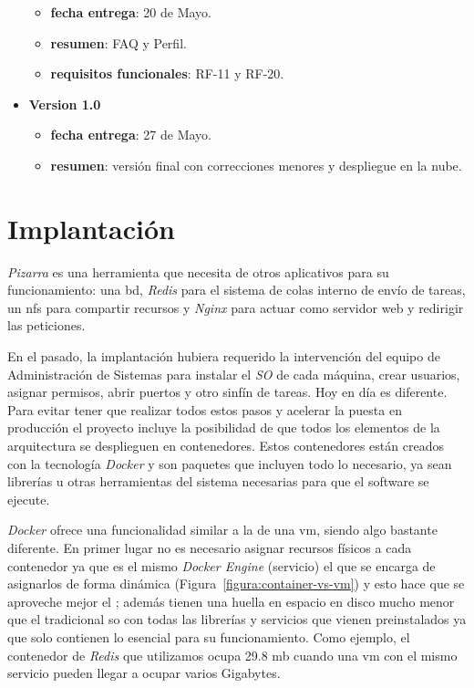 \documentclass[11pt,spanish,listoffigures,listoftables]{tfgetsinf}
\begin{document}
\begin{itemize}
\begin{itemize}
	\item \textbf{fecha entrega}: 20 de Mayo.
	\item \textbf{resumen}: FAQ y Perfil. 
	\item \textbf{requisitos funcionales}: RF-11 y RF-20.
\end{itemize}
	\item \textbf{Version 1.0}
\begin{itemize}
	\item \textbf{fecha entrega}: 27 de Mayo.
	\item \textbf{resumen}: versión final con correcciones menores y despliegue en la nube.
\end{itemize}	
\end{itemize}

\chapter{Implantación}

\textit{Pizarra} es una herramienta que necesita de otros aplicativos para su funcionamiento: una \acrfull{bd}, \textit{Redis} para el sistema de \gls{cola}s interno de envío de \gls{tarea}s, un \acrshort{nfs} para compartir recursos y \textit{Nginx} para actuar como servidor web y redirigir las peticiones. 

En el pasado, la implantación hubiera requerido la intervención del equipo de Administración de Sistemas para instalar el \textit{SO} de cada máquina, crear usuarios, asignar permisos, abrir puertos y otro sinfín de tareas. Hoy en día es diferente.
Para evitar tener que realizar todos estos pasos y acelerar la puesta en producción el proyecto incluye la posibilidad de que todos los elementos de la arquitectura se desplieguen en \Gls{contenedor}es. Estos \Gls{contenedor}es están creados con la tecnología \textit{Docker} y son paquetes que incluyen todo lo necesario, ya sean librerías u otras herramientas del sistema necesarias para que el software se ejecute.

\textit{Docker} ofrece una funcionalidad similar a la de una \acrfull{vm}, siendo algo bastante diferente. En primer lugar no es necesario asignar recursos físicos a cada \gls{contenedor} ya que es el mismo \textit{Docker Engine} (servicio) el que se encarga de asignarlos de forma dinámica (Figura~\ref{figura:container-vs-vm}) y esto hace que se aproveche mejor el ; además tienen una huella en espacio en disco mucho menor que el tradicional \acrshort{so} con todas las librerías y servicios que vienen preinstalados ya que solo contienen lo esencial para su funcionamiento. Como ejemplo, el \gls{contenedor} de \textit{Redis} que utilizamos ocupa 29.8 \acrshort{mb} cuando una \acrshort{vm} con el mismo servicio pueden llegar a ocupar varios Gigabytes.
\end{document}
